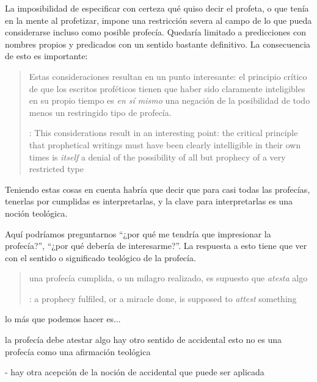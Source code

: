 La imposibilidad de especificar con certeza qué quiso decir el profeta, o que
tenía en la mente al profetizar, impone una restricción severa al campo de lo
que pueda considerarse incluso como posible profecía. Quedaría limitado a
predicciones con nombres propios y predicados con un sentido bastante
definitivo. La consecuencia de esto es importante:
\blockquote[{\cite[31]{anscombe2008faith:prophandmi}}: This considerations
result in an interesting point: the critical principle that prophetical writings
must have been clearly intelligible in their own times is \emph{itself} a denial
of the possibility of all but prophecy of a very restricted type]{Estas
  consideraciones resultan en un punto interesante: el principio crítico de que
  los escritos proféticos tienen que haber sido claramente inteligibles en su
  propio tiempo es \emph{en sí mismo} una negación de la posibilidad de todo
  menos un restringido tipo de profecía.}
Teniendo estas cosas en cuenta habría que decir que para casi todas las
profecías, tenerlas por cumplidas es interpretarlas, y la clave para
interpretarlas es una noción teológica.

Aquí podríamos preguntarnos \enquote{¿por qué me tendría que impresionar la
  profecía?}, \enquote{¿por qué debería de interesarme?}. La respuesta a esto
tiene que ver con el sentido o significado teológico de la profecía.
\blockquote[{\cite[32]{anscombe2008faith:prophandmi}}: a prophecy fulfiled, or a
miracle done, is supposed to \emph{attest} something]{una profecía cumplida, o
  un milagro realizado, es supuesto que \emph{atesta} algo}.

lo más que podemos hacer es...

la profecía debe atestar algo
hay otro sentido de accidental
esto no es una profecía como una afirmación teológica

- hay otra acepción de la noción de accidental que puede ser aplicada


